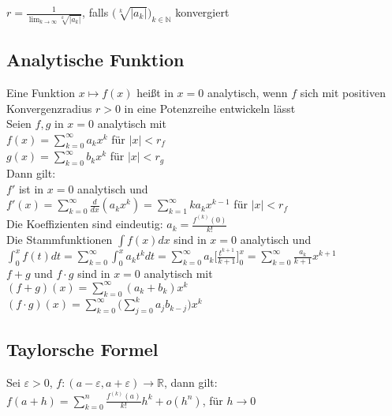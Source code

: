 \documentclass[a4paper,9pt]{extarticle}
\newcommand{\liminfty}[1][n]{\lim_{#1 \to \infty}}
\newcommand{\suminfty}[1][k = 1]{\sum_{#1}^{\infty}}
\begin{document}
	$r = \frac 1 {\liminfty [k] \sqrt[k]{|a_k|}}$, falls $\big(\sqrt[k]{|a_k|}\big)_{k \in \mathbb{N}}$ konvergiert
	
	\subsection*{Analytische Funktion}
	Eine Funktion $x \mapsto f(x)$ heißt in $x = 0$ analytisch, wenn $f$ sich mit positiven Konvergenzradius $r > 0$ in eine Potenzreihe entwickeln lässt \\
	
	Seien $f,g$ in $x = 0$ analytisch mit \\
	$f(x) = \suminfty[k = 0] a_kx^k$ für $|x| < r_f$ \\
	$g(x) = \suminfty[k = 0] b_kx^k$ für $|x| < r_g$ \\
	
	Dann gilt: \\
	$f'$ ist in $x = 0$ analytisch und \\	
	$f'(x) = \suminfty[k = 0] \frac d {dx} (a_kx^k) = \suminfty ka_kx^{k-1}$ für $|x| < r_f$ \\
	
	Die Koeffizienten sind eindeutig: $a_k = \frac{f^{(k)}(0)}{k!}$ \\
	
	Die Stammfunktionen $\int f(x) dx$ sind in $x = 0$ analytisch und \\	
	$\int_0^x f(t) dt = \suminfty[k = 0] \int_0^x a_kt^k dt = \suminfty[k = 0] a_k \Bigg[\frac{t^{k + 1}}{k + 1}\Bigg]_0^x = \suminfty[k = 0] \frac{a_k}{k + 1} x^{k + 1}$ \\
	
	$f + g$ und $f ⋅ g$ sind in $x = 0$ analytisch mit \\
	$(f + g) (x) = \suminfty[k = 0] (a_k + b_k) x^k$ \\
	$(f ⋅ g) (x) = \suminfty[k = 0] \Big(\sum_{j = 0}^k a_jb_{k -j} \Big)x^k$
		
	
	
	
	\subsection*{Taylorsche Formel}
	Sei $\varepsilon > 0$, $f : (a-\varepsilon,a + \varepsilon) → \mathbb{R}$, dann gilt: \\
	$f(a + h) = \sum_{k = 0}^n \frac{f^{(k)}(a)}{k!}h^k + o(h^n)$, für $h → 0$
	
\end{document}
